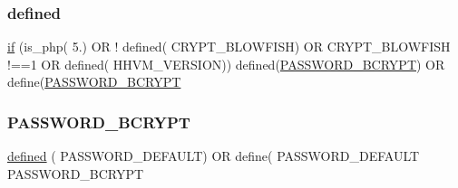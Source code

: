 \subsubsection{\texorpdfstring{defined}{defined}}
{\footnotesize\ttfamily \mbox{\hyperlink{_test_test_8php_a107bc088eea0dce8972b45c841f5ff9c}{if}} (is\+\_\+php( \textquotesingle{}5.\textquotesingle{}) OR ! defined( \textquotesingle{}C\+R\+Y\+P\+T\+\_\+\+B\+L\+O\+W\+F\+I\+SH\textquotesingle{}) OR C\+R\+Y\+P\+T\+\_\+\+B\+L\+O\+W\+F\+I\+SH !==1 OR defined( \textquotesingle{}H\+H\+V\+M\+\_\+\+V\+E\+R\+S\+I\+ON\textquotesingle{})) defined(\textquotesingle{}\mbox{\hyperlink{password_8php_a68891a3748e6362ed60dd2dc90d37576}{P\+A\+S\+S\+W\+O\+R\+D\+\_\+\+B\+C\+R\+Y\+PT}}\textquotesingle{}) OR define(\textquotesingle{}\mbox{\hyperlink{password_8php_a68891a3748e6362ed60dd2dc90d37576}{P\+A\+S\+S\+W\+O\+R\+D\+\_\+\+B\+C\+R\+Y\+PT}}\textquotesingle{}}

\mbox{\label{password_8php_a68891a3748e6362ed60dd2dc90d37576}} 
\subsubsection{\texorpdfstring{P\+A\+S\+S\+W\+O\+R\+D\+\_\+\+B\+C\+R\+Y\+PT}{PASSWORD\_BCRYPT}}
{\footnotesize\ttfamily \mbox{\hyperlink{password_8php_a74f41c0efe4435fb8ac2133464d3cd57}{defined}} ( \textquotesingle{}P\+A\+S\+S\+W\+O\+R\+D\+\_\+\+D\+E\+F\+A\+U\+LT\textquotesingle{}) OR define( \textquotesingle{}P\+A\+S\+S\+W\+O\+R\+D\+\_\+\+D\+E\+F\+A\+U\+LT\textquotesingle{} P\+A\+S\+S\+W\+O\+R\+D\+\_\+\+B\+C\+R\+Y\+PT}

